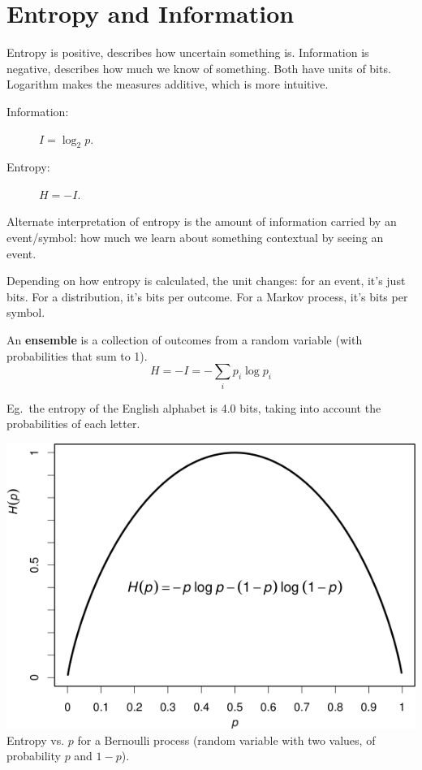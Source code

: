 \documentclass[a4paper, 11pt]{article}
\begin{document}
\section*{Entropy and Information}
{
    \begin{minipage}[t]{0.6\textwidth}
    Entropy is positive, describes how uncertain something is. Information is negative, describes how much we know of something. Both have units of bits. Logarithm makes the measures additive, which is more intuitive.

    \begin{description}
    \item[Information:] \(I = \log_2p\).
    \item[Entropy:] \(H = -I\).
    \end{description}

    Alternate interpretation of entropy is the amount of information carried by an event/symbol: how much we learn about something contextual by seeing an event.

    Depending on how entropy is calculated, the unit changes: for an event, it's just bits. For a distribution, it's bits per outcome. For a Markov process, it's bits per symbol.

    An \textbf{ensemble} is a collection of outcomes from a random variable (with probabilities that sum to 1).
    \[H = -I = -\sum_i{p_i\log p_i}\]

    Eg.\ the entropy of the English alphabet is 4.0 bits, taking into account the probabilities of each letter.
    \end{minipage}
    \hspace{3mm}
    \begin{minipage}[t]{0.35\textwidth}
    \vspace{0pt}
    \centering
    \includegraphics[width=\textwidth]{bernoulli-entropy.png}
    Entropy vs. \(p\) for a Bernoulli process (random variable with two values, of probability \(p\) and \(1-p\)).
    \end{minipage}

}
\end{document}
